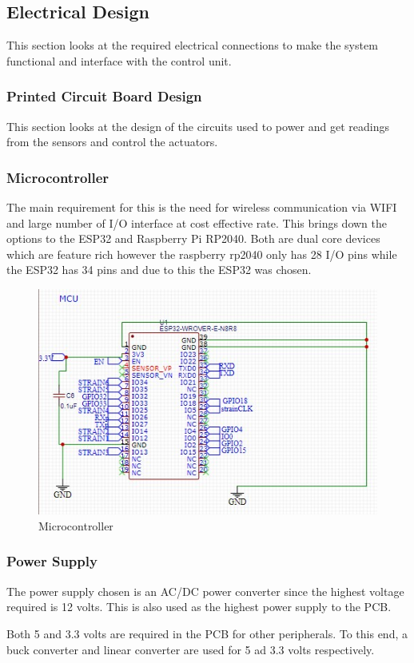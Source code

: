 \subsection{Electrical Design}
This section looks at the required electrical connections to make the system functional and interface with the control unit.
\subsubsection{Printed Circuit Board Design}
This section looks at the design of the circuits used to power and get readings from the sensors and control the actuators.

\subsubsection{Microcontroller}
The main requirement for this is the need for wireless communication via WIFI and large number of I/O interface at cost effective rate. This brings down the options to the ESP32 and Raspberry Pi RP2040. Both are dual core devices which are feature rich however the raspberry rp2040 only has 28 I/O pins while the ESP32 has 34 pins and due to this the ESP32 was chosen.
\begin{center}
	\begin{figure}[H]
		\centering
		\includegraphics[width=0.7\linewidth]{Figures/mcu}
		\caption[Microcontroller]{Microcontroller}
	\end{figure}
\end{center}
\subsubsection{Power Supply}
The power supply chosen is an AC/DC power converter since the highest voltage required is 12 volts. This is also used as the highest power supply to the PCB.

Both 5 and 3.3 volts are required in the PCB for other peripherals. To this end, a buck converter and linear converter are used for 5 ad 3.3 volts respectively.

